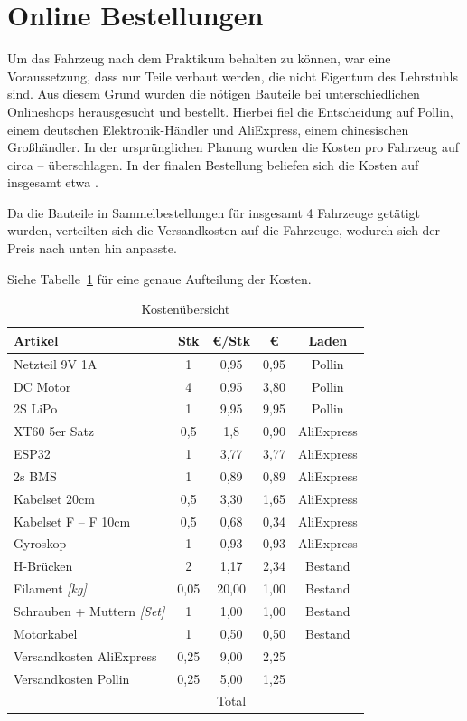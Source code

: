 \section{Online Bestellungen}
Um das Fahrzeug nach dem Praktikum behalten zu können, war eine Voraussetzung, dass nur Teile verbaut werden, die nicht Eigentum des Lehrstuhls sind.
Aus diesem Grund wurden die nötigen Bauteile bei unterschiedlichen Onlineshops herausgesucht und bestellt.
Hierbei fiel die Entscheidung auf Pollin, einem deutschen Elektronik-Händler und AliExpress, einem chinesischen Großhändler.
In der ursprünglichen Planung wurden die Kosten pro Fahrzeug auf circa  --  überschlagen.
In der finalen Bestellung beliefen sich die Kosten auf insgesamt etwa .

Da die Bauteile in Sammelbestellungen für insgesamt 4 Fahrzeuge getätigt wurden, verteilten sich die Versandkosten auf die Fahrzeuge, wodurch sich der Preis nach unten hin anpasste. 

Siehe Tabelle~\ref{table:Kosten} für eine genaue Aufteilung der Kosten.
\begin{table}[!ht]
	\centering
\begin{tabular}{lcccc}
	Artikel & Stk & \euro/Stk & \euro{} & Laden\\
	\midrule[2pt]
	Netzteil 9V 1A & 1 & 0,95 & 0,95 & Pollin\\
	\midrule
	DC Motor & 4 & 0,95 & 3,80 & Pollin\\
	\midrule
	2S LiPo & 1 & 9,95 & 9,95 & Pollin\\
	\midrule
	XT60 5er Satz & 0,5 & 1,8 & 0,90 & AliExpress\\
	\midrule
	ESP32 & 1 & 3,77 & 3,77 & AliExpress\\
	\midrule
	2s BMS & 1 & 0,89 & 0,89 & AliExpress\\
	\midrule
	Kabelset 20cm & 0,5 & 3,30 & 1,65 & AliExpress\\
	\midrule
	Kabelset F -- F 10cm & 0,5 & 0,68 & 0,34 & AliExpress\\
	\midrule
	Gyroskop & 1 & 0,93 & 0,93 & AliExpress\\
	\midrule
	H-Brücken & 2 & 1,17 & 2,34 & Bestand\\
	\midrule
	Filament \textit{[kg]} & 0,05 & 20,00 & 1,00 & Bestand\\
	\midrule
	Schrauben + Muttern \textit{[Set]} & 1 & 1,00 & 1,00 & Bestand\\
	\midrule
	Motorkabel & 1 & 0,50 & 0,50 & Bestand\\
	\midrule
	Versandkosten AliExpress & 0,25 & 9,00 & 2,25 & \\
	\midrule
	Versandkosten Pollin & 0,25 & 5,00 & 1,25 & \\
	\midrule
	\midrule
	 &  & Total & \EUR{31,52} & \\
\end{tabular} 
\caption{Kostenübersicht} 
\label{table:Kosten}
\end{table} 

